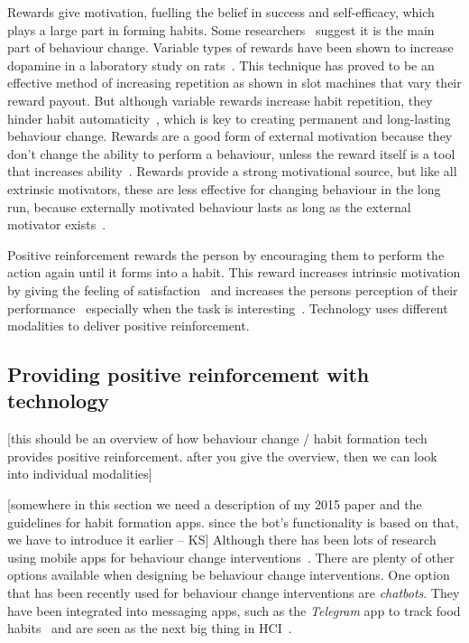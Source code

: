 \documentclass{scaffold/sigchi}
\begin{document}
Rewards give motivation, fuelling the belief in success and self-efficacy, which plays a large part in forming habits. Some researchers~\cite{article_a_self_efficacy} suggest it is the main part of behaviour change. Variable types of rewards have been shown to increase dopamine in a laboratory study on rats~\cite{variable_rewards_increases_dopamine}. This technique has proved to be an effective method of increasing repetition as shown in slot machines that vary their reward payout. But although variable rewards increase habit repetition, they hinder habit automaticity~\cite{variable_rewards_increases_dopamine}, which is key to creating permanent and long-lasting behaviour change. Rewards are a good form of external motivation because they don't change the ability to perform a behaviour, unless the reward itself is a tool that increases ability~\cite{article_taxonomy_motivational_affordances_meaningful}. Rewards provide a strong motivational source, but like all extrinsic motivators, these are less effective for changing behaviour in the long run, because externally motivated behaviour lasts as long as the external motivator exists~\cite{article_beyond_self_tracking_designing_apps}.

Positive reinforcement rewards the person by encouraging them to perform the action again until it forms into a habit. This reward increases intrinsic motivation by giving the feeling of satisfaction~\cite{article_promoting_habit_formation} and increases the persons perception of their performance~\cite{positive_reinforcement_pro} especially when the task is interesting~\cite{article_meta_analytic_review_intrinsic_motivation}. Technology uses different modalities to deliver positive reinforcement.

\subsection{Providing positive reinforcement with technology}
[this should be an overview of how behaviour change / habit formation tech provides positive reinforcement. after you give the overview, then we can look into individual modalities]

[somewhere in this section we need a description of my 2015 paper and the guidelines for habit formation apps. since the bot's functionality is based on that, we have to introduce it earlier -- KS]
Although there has been lots of research using mobile apps for behaviour change interventions~\cite{survey_on_current_apps_of_steel}. There are plenty of other options available when designing be behaviour change interventions. One option that has been recently used for behaviour change interventions are \textit{chatbots}. They have been integrated into messaging apps, such as the \textit{Telegram} app to track food habits~\cite{telegram_bot_tracking_habits} and are seen as the next big thing in HCI~\cite{chatbots_and_new_world_of_hci}.
\end{document}
